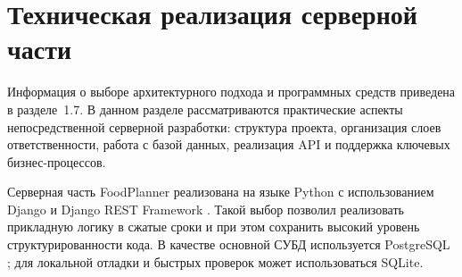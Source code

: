 \section{Техническая реализация серверной части}

Информация о выборе архитектурного подхода и программных средств приведена в разделе~1.7. В данном разделе рассматриваются практические аспекты непосредственной серверной разработки: структура проекта, организация слоев ответственности, работа с базой данных, реализация API и поддержка ключевых бизнес-процессов.

Серверная часть FoodPlanner реализована на языке Python с использованием Django и Django REST Framework \cite{python_docs_2026,django_docs_2026,drf_docs_2026}. Такой выбор позволил реализовать прикладную логику в сжатые сроки и при этом сохранить высокий уровень структурированности кода. В качестве основной СУБД используется PostgreSQL \cite{postgresql_docs_2026}; для локальной отладки и быстрых проверок может использоваться SQLite.

